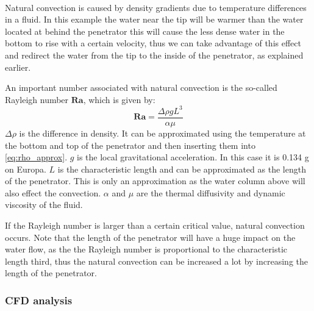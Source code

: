 \\
Natural convection is caused by density gradients due to temperature differences in a fluid. In this example the water near the tip will be warmer than the water located at behind the penetrator this will cause the less dense water in the bottom to rise with a certain velocity, thus we can take advantage of this effect and redirect the water from the tip to the inside of the penetrator, as explained earlier\cite{website:naturalConvectionPdf}.

An important number associated with natural convection is the so-called Rayleigh number $\mathbf{Ra}$, which is given by\cite{website:naturalConvectionWiki}:
\begin{equation}
	\mathbf{Ra} = \frac{\Delta\rho g L^3}{\alpha \mu}
\end{equation}
$\Delta\rho$ is the difference in density. It can be approximated using the temperature at the bottom and top of the penetrator and then inserting them into \eqref{eq:rho_approx}. $g$ is the local gravitational acceleration. In this case it is 0.134 g on Europa\cite{website:europaGravity}. $L$ is the characteristic length and can be approximated as the length of the penetrator. This is only an approximation as the water column above will also effect the convection. $\alpha$ and $\mu$ are the thermal diffusivity and dynamic viscosity of the fluid.

If the Rayleigh number is larger than a certain critical value, natural convection occurs. Note that the length of the penetrator will have a huge impact on the water flow, as the the Rayleigh number is proportional to the characteristic length third, thus the natural convection can be increased a lot by increasing the length of the penetrator.


\subsubsection{CFD analysis}

